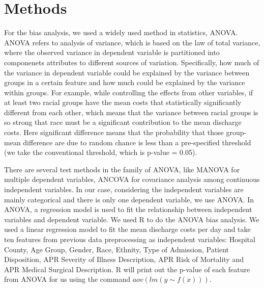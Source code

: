 \documentclass[10pt,twocolumn,letterpaper]{article}
\begin{document}


\section{Methods}

For the bias analysis, we used a widely used method in statistics, ANOVA. ANOVA refers to analysis of variance, which is based on the law of total variance, where the observed variance in dependent variable is partitioned into componenets attributes to different sources of variation. Specifically, how much of the variance in dependent variable could be explained by the variance between groups in a certain feature and how much could be explained by the variance within groups. For example, while controlling the effects from other variables, if at least two racial groups have the mean costs that statistically significantly different from each other, which means that the variance between racial groups is so strong that race must be a significant contribution to the mean discharge costs. Here significant difference means that the probability that those group-mean difference are due to random chance is less than a pre-specified threshold (we take the conventional threshold, which is p-value = 0.05).

There are several test methods in the family of ANOVA, like MANOVA for multiple dependent variables, ANCOVA for covariance analysis among continuous independent variables. In our case, considering the independent variables are mainly categorical and there is only one dependent variable, we use ANOVA. 
In ANOVA, a regression model is used to fit the relationship between independent variables and dependent variable. We used R to do the ANOVA bias analysis. We used a linear regression model to fit the mean discharge costs per day and take ten features from previous data preprocessing as independent variables: Hospital County, Age Group, Gender, Race, Ethnity, Type of Admission, Patient Disposition, APR Severity of Illness Description, APR Risk of Mortality and APR Medical Surgical Description. R will print out the p-value of each feature from ANOVA for us using the command $aov(lm(y\sim f(x)))$. 
\end{document}

